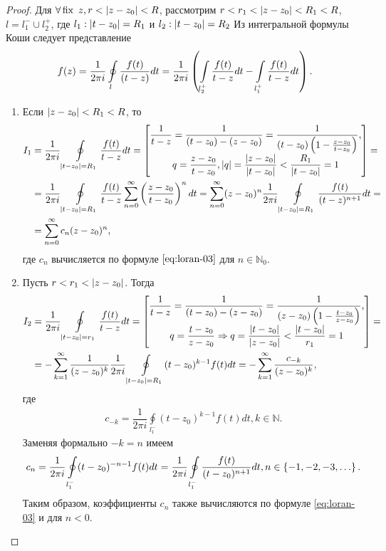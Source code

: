 \begin{proof}
  Для $\forall \operatorname{\text{fix }} z, r < \left\lvert z - z_0 \right\rvert < R$, рассмотрим
  ${r < r_1 < \left\lvert z - z_0 \right\rvert < R_1 < R}$,
  ${l = l_1^-\cup l_2^+}$, где $l_1: \left\lvert t - z_0 \right\rvert = R_1$
  и $l_2: \left\lvert t - z_0 \right\rvert = R_2$
  Из интегральной формулы Коши следует представление
  \begin{align*}
    f(z) = \dfrac{1}{2\pi i}\oint\limits_l\dfrac{f(t)}{(t - z)}dt = \dfrac{1}{2\pi i}
    \left( \int\limits_{l_2^+}\dfrac{f(t)}{t - z}dt - \int\limits_{l_1^+}\dfrac{f(t)}{t - z}dt \right).
  \end{align*}
  \begin{enumerate}
  \item Если $\left\lvert z - z_0 \right\rvert < R_1 < R$, то
    \begin{align*}
      I_1 &= \dfrac{1}{2\pi i}\oint\limits_{\left\lvert t - z_0 \right\rvert = R_1}\dfrac{f(t)}{t - z}dt = \left[\begin{matrix}\dfrac{1}{t - z}
        = \dfrac{1}{(t - z_0) - (z - z_0)} = \dfrac{1}{(t - z_0)\left( 1 - \frac{z - z_0}{t - z_0} \right)},\\
        q = \dfrac{z - z_0}{t -  z_0}, \left\lvert q \right\rvert = \dfrac{\left\lvert z - z_0 \right\rvert}{\left\lvert t -  z_0 \right\rvert} < \dfrac{R_1}{\left\lvert t - z_0 \right\rvert} = 1\end{matrix}\right] =\\
      &= \dfrac{1}{2\pi i}\oint\limits_{\left\lvert t - z_0 \right\rvert = R_1}\dfrac{f(t)}{t - z}\sum\limits_{n = 0}^{\infty}
      \left( \dfrac{z - z_0}{t - z_0} \right)^ndt =
      \sum\limits_{n = 0}^{\infty}(z - z_0)^n\dfrac{1}{2\pi i}\oint\limits_{\left\lvert t - z_0 \right\rvert = R_1}
      \dfrac{f(t)}{(t - z)^{n + 1}}dt =\\
      &=\sum\limits_{n = 0}^{\infty}c_n(z - z_0)^n,
    \end{align*}
    где $c_n$ вычисляется по формуле $\eqref{eq:loran-03}$ для $n \in \mathbb{N}_0$.
  \item Пусть $r < r_1 < \left\lvert z - z_0 \right\rvert$. Тогда
    \begin{align*}
      I_2 &= \dfrac{1}{2\pi i}\oint\limits_{\left\lvert t - z_0 \right\rvert = r_1}\dfrac{f(t)}{t - z}dt = \left[\begin{matrix}\dfrac{1}{t - z}
        = \dfrac{1}{(t - z_0) - (z - z_0)} = \dfrac{1}{(z - z_0)\left( 1 - \frac{t - z_0}{z - z_0} \right)},\\
        q = \dfrac{t - z_0}{z -  z_0} \Rightarrow
        q = \dfrac{\left\lvert t - z_0 \right\rvert}{\left\lvert z - z_0 \right\rvert} <
        \dfrac{\left\lvert t - z_0 \right\rvert}{r_1} = 1\end{matrix}\right] =\\
      & =-\sum\limits_{k = 1}^{\infty}\dfrac{1}{(z - z_0)^k}\dfrac{1}{2\pi i}\oint\limits_{\left\lvert t - z_0 \right\rvert = R_1}(t - z_0)^{k - 1}f(t)dt =-\sum\limits_{k = 1}^{\infty}\dfrac{c_{-k}}{(z - z_0)^k},
    \end{align*}
    где
    \begin{align*}
      c_{-k} = \dfrac{1}{2\pi i}\oint\limits_{l_1^-}(t - z_0)^{k - 1}f(t)dt, k \in \mathbb{N}.
    \end{align*}
    Заменяя формально $-k = n$ имеем
    \begin{align*}
      c_n = \dfrac{1}{2\pi i}\oint\limits_{l_1^-}(t - z_0)^{-n - 1}f(t)dt = \dfrac{1}{2\pi i}
      \oint\limits_{l_1^-}\dfrac{f(t)}{(t - z_0)^{n + 1}}dt, n \in \left\{ -1, -2, -3, \ldots \right\}.
    \end{align*}
    Таким образом, коэффициенты $c_n$ также вычисляются по формуле \eqref{eq:loran-03} и для $n < 0$.
  \end{enumerate}


\end{proof}
